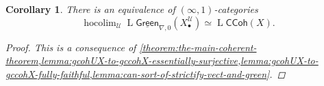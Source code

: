 \documentclass[11pt,fleqn]{article}
\theoremstyle{plain}
\newtheorem{corollary}[theorem]{Corollary}
\theoremstyle{definition}
\theoremstyle{remark}
\numberwithin{equation}{theorem}
\newcommand{\cover}{\mathcal{U}}
\newcommand{\gccohX}{\mathsf{CCoh}(X)}
\newcommand{\sgreenzeroX}{\underline{\mathsf{Green}}_{\nabla,0}(X_\bullet^\cover)}
\DeclareMathOperator{\LL}{L}
\DeclareMathOperator{\hocolim}{hocolim}
\begin{document}
        \begin{corollary}\label{corollary:the-main-coherent-corollary}
            There is an equivalence of $(\infty,1)$-categories
            \begin{equation*}
                \hocolim_\cover\LL{\sgreenzeroX} \simeq \LL{\gccohX}.
            \end{equation*}
            \begin{proof}
                This is a consequence of \cref{theorem:the-main-coherent-theorem,lemma:gcohUX-to-gccohX-essentially-surjective,lemma:gcohUX-to-gccohX-fully-faithful,lemma:can-sort-of-strictify-vect-and-green}.
            \end{proof}
        \end{corollary}



\printbibliography
\end{document}
